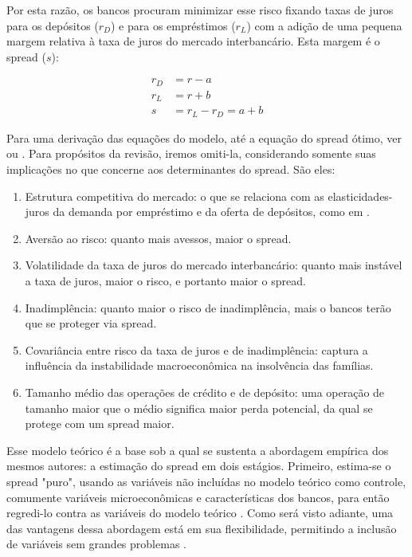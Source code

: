 \documentclass[a4paper, article, 12pt, openany, oneside, english, brazil]{abntex2}
\numberwithin{equation}{section}
\begin{document}
    Por esta razão, os bancos procuram minimizar esse risco fixando taxas de juros para os depósitos ($r_D$) e para os empréstimos ($r_L$) com a adição de uma pequena margem relativa à taxa de juros do mercado interbancário. Esta margem é o spread ($s$):

	\begin{align}
        r_D &= r - a \\
        r_L &= r + b \\
        s &= r_L - r_D = a + b
	\end{align}

    Para uma derivação das equações do modelo, até a equação do spread ótimo, ver  ou . Para propósitos da revisão, iremos omiti-la, considerando somente suas implicações no que concerne aos determinantes do spread. São eles:

	\begin{enumerate}
		\item Estrutura competitiva do mercado: o que se relaciona com as elasticidades-juros da demanda por empréstimo e da oferta de depósitos, como em .
		\item Aversão ao risco: quanto mais avessos, maior o spread.
		\item Volatilidade da taxa de juros do mercado interbancário: quanto mais instável a taxa de juros, maior o risco, e portanto maior o spread.
		\item Inadimplência: quanto maior o risco de inadimplência, mais o bancos terão que se proteger via spread.
		\item Covariância entre risco da taxa de juros e de inadimplência: captura a influência da instabilidade macroeconômica na insolvência das famílias. \cite{oreiro}
		\item Tamanho médio das operações de crédito e de depósito: uma operação de tamanho maior que o médio significa maior perda potencial, da qual se protege com um spread maior.
	\end{enumerate}

    Esse modelo teórico é a base sob a qual se sustenta a abordagem empírica dos mesmos autores: a estimação do spread em dois estágios. Primeiro, estima-se o spread "puro", usando as variáveis não incluídas no modelo teórico como controle, comumente variáveis microeconômicas e características dos bancos, para então regredi-lo contra as variáveis do modelo teórico . Como será visto adiante, uma das vantagens dessa abordagem está em sua flexibilidade, permitindo a inclusão de variáveis sem grandes problemas .
\end{document}
